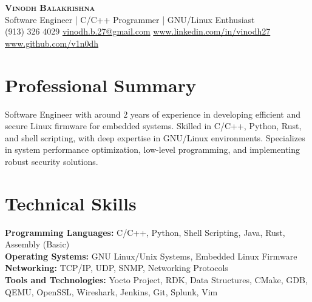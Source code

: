 \documentclass[9pt, letterpad]{extarticle}
\renewcommand{\maketitle}[6]{
	\begin{center}
	\Large{\bfseries\scshape{#1}} \\
	\vspace*{0.25em}
	\small {#2} \\
	\vspace*{0.25em}
	\faPhoneSquare \hspace{0.1em} {#3} \hspace*{0.5em}
	\faEnvelope \hspace{0.1em} \href{mailto:#4}{#4} \hspace*{0.5em}
	\faLinkedinSquare \hspace{0.1em} \href{https://#5}{#5} \hspace{0.5em}
	\faGithubSquare \hspace{0.1em} \href{https://#6}{#6}
	\end{center}
}
\begin{document}
\maketitle
{Vinodh Balakrishna}
{Software Engineer | C/C++ Programmer | GNU/Linux Enthusiast}
{(913) 326 4029}
{vinodh.b.27@gmail.com}
{www.linkedin.com/in/vinodh27}
{www.github.com/v1n0dh}

\thispagestyle{empty}

\noindent
\section{Professional Summary}
Software Engineer with around 2 years of experience in developing efficient and secure Linux firmware for embedded systems. Skilled in C/C++, Python, Rust, and shell scripting, with deep expertise in GNU/Linux environments. Specializes in system performance optimization, low-level programming, and implementing robust security solutions.

\section{Technical Skills}
\textbf{Programming Languages:} C/C++, Python, Shell Scripting, Java, Rust, Assembly (Basic) \\
\textbf{Operating Systems:} GNU Linux/Unix Systems, Embedded Linux Firmware \\
\textbf{Networking:} TCP/IP, UDP, SNMP, Networking Protocols \\
\textbf{Tools and Technologies:} Yocto Project, RDK, Data Structures, CMake, GDB, QEMU, OpenSSL, Wireshark, Jenkins, Git, Splunk, Vim
\end{document}
